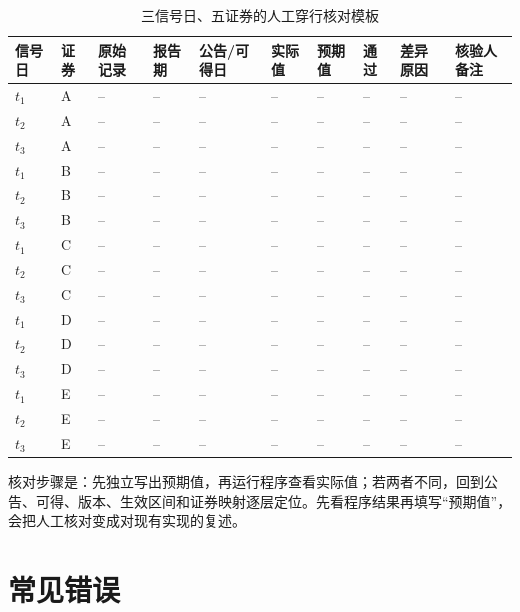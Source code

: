 \begingroup
\scriptsize
\setlength{\tabcolsep}{2pt}
\begin{longtable}{@{}p{}p{}p{}p{}p{}p{}p{}p{}p{}p{}@{}}
\caption{三信号日、五证券的人工穿行核对模板}\label{tab:ch02-walkthrough-template}\\
\toprule
信号日 & 证券 & 原始记录 & 报告期 & 公告/可得日 & 实际值 & 预期值 & 通过 & 差异原因 & 核验人备注 \\
\midrule
\endhead
$t_1$ & A & -- & -- & -- & -- & -- & -- & -- & -- \\
$t_2$ & A & -- & -- & -- & -- & -- & -- & -- & -- \\
$t_3$ & A & -- & -- & -- & -- & -- & -- & -- & -- \\
$t_1$ & B & -- & -- & -- & -- & -- & -- & -- & -- \\
$t_2$ & B & -- & -- & -- & -- & -- & -- & -- & -- \\
$t_3$ & B & -- & -- & -- & -- & -- & -- & -- & -- \\
$t_1$ & C & -- & -- & -- & -- & -- & -- & -- & -- \\
$t_2$ & C & -- & -- & -- & -- & -- & -- & -- & -- \\
$t_3$ & C & -- & -- & -- & -- & -- & -- & -- & -- \\
$t_1$ & D & -- & -- & -- & -- & -- & -- & -- & -- \\
$t_2$ & D & -- & -- & -- & -- & -- & -- & -- & -- \\
$t_3$ & D & -- & -- & -- & -- & -- & -- & -- & -- \\
$t_1$ & E & -- & -- & -- & -- & -- & -- & -- & -- \\
$t_2$ & E & -- & -- & -- & -- & -- & -- & -- & -- \\
$t_3$ & E & -- & -- & -- & -- & -- & -- & -- & -- \\
\bottomrule
\end{longtable}
\endgroup

核对步骤是：先独立写出预期值，再运行程序查看实际值；若两者不同，回到公告、可得、版本、生效区间和证券映射逐层定位。先看程序结果再填写“预期值”，会把人工核对变成对现有实现的复述。

\section{常见错误}

